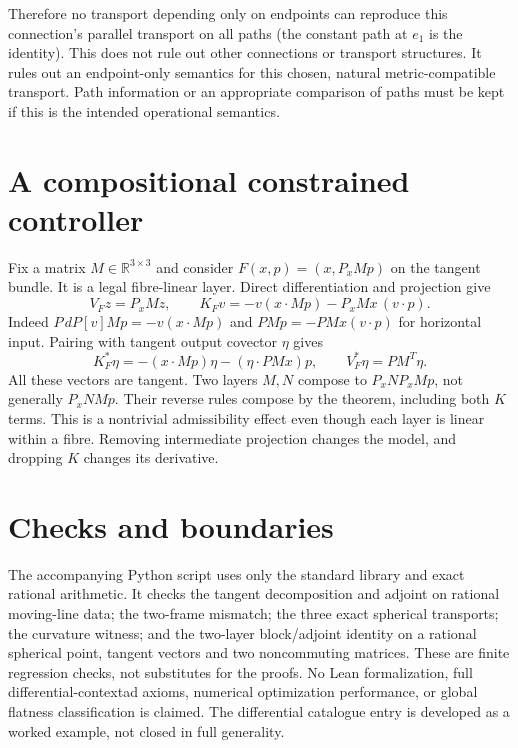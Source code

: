 \documentclass[11pt]{article}
\newcommand{\R}{\mathbb R}
\begin{document}
Therefore no transport depending only on endpoints can reproduce this connection's parallel transport on all paths (the constant path at $e_1$ is the identity). This does not rule out other connections or transport structures. It rules out an endpoint-only semantics for this chosen, natural metric-compatible transport. Path information or an appropriate comparison of paths must be kept if this is the intended operational semantics.

\section{A compositional constrained controller}
Fix a matrix $M\in\R^{3\times3}$ and consider $F(x,p)=(x,P_xMp)$ on the tangent bundle. It is a legal fibre-linear layer. Direct differentiation and projection give
\[
 V_Fz=P_xMz,\qquad
 K_Fv=-v(x\cdot Mp)-P_xMx\,(v\cdot p).
\]
Indeed $P\,dP[v]Mp=-v(x\cdot Mp)$ and $PM\dot p=-PMx(v\cdot p)$ for horizontal input. Pairing with tangent output covector $\eta$ gives
\[
 \boxed{K_F^*\eta=-(x\cdot Mp)\eta-(\eta\cdot PMx)p,\qquad V_F^*\eta=PM^T\eta.}
\]
All these vectors are tangent. Two layers $M,N$ compose to $P_xNP_xMp$, not generally $P_xNMp$. Their reverse rules compose by the theorem, including both $K$ terms. This is a nontrivial admissibility effect even though each layer is linear within a fibre. Removing intermediate projection changes the model, and dropping $K$ changes its derivative.

\section{Checks and boundaries}
The accompanying Python script uses only the standard library and exact rational arithmetic. It checks the tangent decomposition and adjoint on rational moving-line data; the two-frame mismatch; the three exact spherical transports; the curvature witness; and the two-layer block/adjoint identity on a rational spherical point, tangent vectors and two noncommuting matrices. These are finite regression checks, not substitutes for the proofs. No Lean formalization, full differential-contextad axioms, numerical optimization performance, or global flatness classification is claimed. The differential catalogue entry is developed as a worked example, not closed in full generality.
\end{document}
